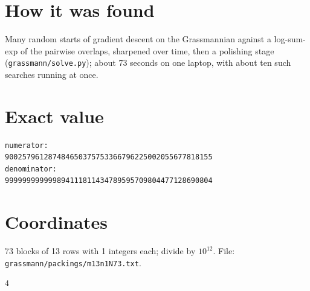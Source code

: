 \documentclass[11pt,a4paper]{article}
\begin{document}
\section{How it was found}
Many random starts of gradient descent on the Grassmannian against a log-sum-exp of the pairwise overlaps, sharpened over time, then a polishing stage (\texttt{grassmann/solve.py}); about 73 seconds on one laptop, with about ten such searches running at once.


\appendix
\section{Exact value}
{\small
\begin{verbatim}
numerator:
900257961287484650375753366796225002055677818155
denominator:
999999999999894111811434789595709804477128690804
\end{verbatim}}

\section{Coordinates}
73 blocks of 13 rows with 1 integers each; divide by $10^{12}$. File: \texttt{grassmann/packings/m13n1N73.txt}.
{\tiny
\begin{multicols}{4}
\end{multicols}}
\end{document}
